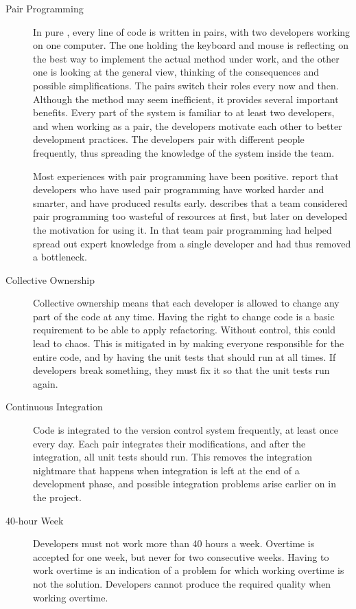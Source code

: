 \begin{description}
\item[Pair Programming] In pure , every line of code is 
written in pairs, with two developers working on one computer. The one 
holding the keyboard and mouse is reflecting on the best way to 
implement the actual method under work, and the other one is looking 
at the general view, thinking of the consequences and possible 
simplifications. The pairs switch their roles every now and then. 
Although the method may seem inefficient, it provides several 
important benefits. Every part of the system is familiar to at least 
two developers, and when working as a pair, the developers motivate 
each other to better development practices. The developers pair with 
different people frequently, thus spreading the knowledge of the 
system inside the team.

Most experiences with pair programming have been positive. 
\cite{strengtheningpair} report that developers who have used pair 
programming have worked harder and smarter, and have produced results 
early. \cite{agileadoption} describes that a team considered pair 
programming too wasteful of resources at first, but later on developed 
the motivation for using it. In that team pair programming had helped 
spread out expert knowledge from a single developer and had thus 
removed a bottleneck.

\item[Collective Ownership] Collective ownership means that each 
developer is allowed to change any part of the code at any time. 
Having the right to change code is a basic requirement to be able to 
apply refactoring. Without control, this could lead to chaos. This is 
mitigated in  by making everyone responsible for the entire 
code, and by having the unit tests that should run at all times. If 
developers break something, they must fix it so that the unit tests 
run again.

\item[Continuous Integration] Code is integrated to the version 
control system frequently, at least once every day. Each pair 
integrates their modifications, and after the integration, all unit 
tests should run. This removes the integration nightmare that happens 
when integration is left at the end of a development phase, and 
possible integration problems arise earlier on in the project.

\item[40-hour Week] Developers must not work more than 40 hours a 
week. Overtime is accepted for one week, but never for two consecutive 
weeks. Having to work overtime is an indication of a problem for which 
working overtime is not the solution. Developers cannot produce the 
required quality when working overtime.


\end{description}
